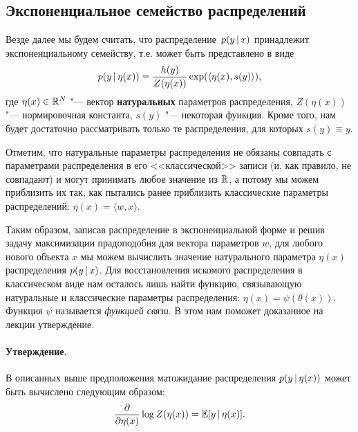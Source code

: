 \documentclass[12pt,a4paper]{article}
\begin{document}
     \subsection{Экспоненциальное семейство распределений}
     \par Везде далее мы будем считать, что распределение~$p(y \mspace{3mu}{|}\mspace{3mu} x)$ принадлежит экспоненциальному семейству, т.е. может быть представлено в виде 
     \begin{equation*}
         p(y \mspace{3mu}{|}\mspace{3mu} \eta(x)) = \frac{h(y)}{Z(\eta(x))} \exp(\langle \eta(x), s(y)\rangle),
     \end{equation*}
     где $\eta(x) \in \mathbb{R}^N$ "--- вектор \textbf{натуральных} параметров распределения, $Z(\eta(x))$ "--- нормировочная константа, $s(y)$ "--- некоторая функция. Кроме того, нам будет достаточно рассматривать только те распределения, для которых $s(y) \equiv y$.
     \par Отметим, что натуральные параметры распределения не обязаны совпадать с параметрами распределения в его <<классической>> записи (и, как правило, не совпадают) и могут принимать любое значение из $\mathbb{R}$, а потому мы можем приблизить их так, как пытались ранее приблизить классические параметры распределений: $\eta(x) = \langle w, x \rangle.$
     \par Таким образом, записав распределение в экспоненциальной форме и решив задачу максимизации прадоподобия для вектора параметров $w$, для любого нового объекта $x$ мы можем вычислить значение натурального параметра $\eta(x)$ распределения $p(y \mspace{3mu}{|}\mspace{3mu} x)$. Для восстановления искомого распределения в классическом виде нам осталось лишь найти функцию, связывающую натуральные и классические параметры распределения: $\eta(x) = \psi (\theta(x))$. Функция $\psi$ называется \emph{функцией связи}. В этом нам поможет доказанное на лекции утверждение.
    \paragraph{Утверждение.}
    В описанных выше предположения матожидание распределения $p(y \mspace{3mu}{|}\mspace{3mu} \eta(x))$ может быть вычислено следующим образом:
    \begin{align*}
        \frac{\partial}{\partial \eta(x)} \log Z(\eta(x)) = \mathbb{E}[y \mspace{3mu}{|}\mspace{3mu} \eta(x)].
    \end{align*}
    
\end{document}
